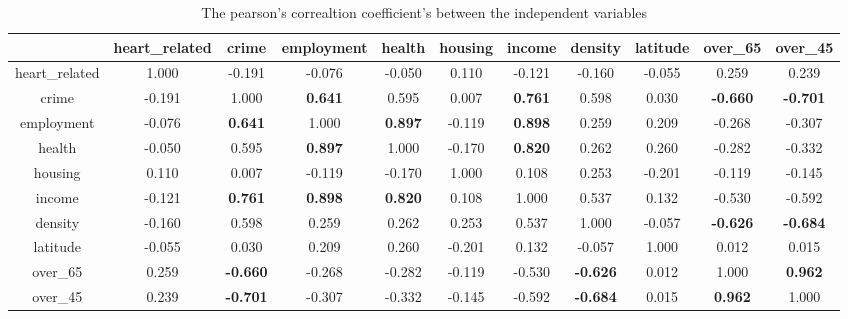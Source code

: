 \documentclass[a4paper]{article}
\begin{document}
\printbibliography



		\begin{table*}[!htpb]
		\scriptsize
			\begin{tabular}{|c|c|c|c|c|c|c|c|c|c|c|}
				\hline
				& heart\_related & crime & employment & health & housing & income & density & latitude & over\_65 & over\_45\\
				\hline
				heart\_related& 1.000& -0.191& -0.076& -0.050& 0.110& -0.121& -0.160& -0.055& 0.259& 0.239\\ 
				\hline
				crime& -0.191& 1.000& \textbf{0.641}& 0.595& 0.007& \textbf{0.761}& 0.598& 0.030& \textbf{-0.660}& \textbf{-0.701}\\ 
				\hline
				employment& -0.076& \textbf{0.641}& 1.000& \textbf{0.897}& -0.119& \textbf{0.898}& 0.259& 0.209& -0.268& -0.307\\ 
				\hline
				health& -0.050& 0.595& \textbf{0.897}& 1.000& -0.170& \textbf{0.820}& 0.262& 0.260& -0.282& -0.332\\ 
				\hline
				housing& 0.110& 0.007& -0.119& -0.170& 1.000& 0.108& 0.253& -0.201& -0.119& -0.145\\ 
				\hline
				income& -0.121& \textbf{0.761}& \textbf{0.898}& \textbf{0.820}& 0.108& 1.000& 0.537& 0.132& -0.530& -0.592\\ 
				\hline
				density& -0.160& 0.598& 0.259& 0.262& 0.253& 0.537& 1.000& -0.057& \textbf{-0.626}& \textbf{-0.684}\\ 
				\hline
				latitude& -0.055& 0.030& 0.209& 0.260& -0.201& 0.132& -0.057& 1.000& 0.012& 0.015\\ 
				\hline
				over\_65& 0.259& \textbf{-0.660}& -0.268& -0.282& -0.119& -0.530& \textbf{-0.626}& 0.012& 1.000& \textbf{0.962}\\ 
				\hline
				over\_45& 0.239&\textbf{-0.701}& -0.307& -0.332& -0.145& -0.592&  \textbf{-0.684}& 0.015& \textbf{0.962}& 1.000\\ 
				\hline
			\end{tabular}
		\caption{The pearson's correaltion coefficient's between the independent variables}
		\label{corr_table}
		\end{table*}
\end{document}
